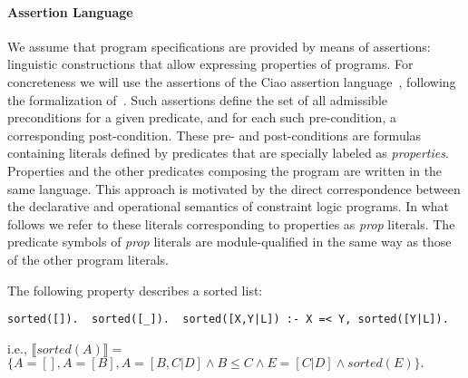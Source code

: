 \documentclass{llncs}
\newcommand{\finalcompression}[1]{\vspace*{#1}}
\begin{document}
\paragraph{Assertion Language}
%
We assume that program specifications are provided by means of
assertions: linguistic constructions that allow expressing properties
of programs.
%
For concreteness we will use the  assertions of the Ciao
assertion language~\cite{%
  prog-glob-an-shorter,%
  assrt-theoret-framework-lopstr99-shorter,hermenegildo11:ciao-design-tplp-shorter},
following the formalization
of~\cite{asrHO-ppdp2014-shorter,optchk-ppdp2016-shorter}.
%
Such  assertions
define the set of all admissible preconditions for
a given predicate, and for each such pre-condition,
a corresponding post-condition.
%
These pre- and post-conditions are formulas containing literals
defined by predicates that are specially labeled as
\emph{properties}.
%
Properties and the other
predicates composing the program are written in the same language.
%
This approach is motivated by the direct correspondence between the
declarative and operational semantics of constraint logic programs.
%
In what follows we refer to these literals corresponding to properties
as \emph{prop} literals.
%
The predicate symbols of \emph{prop} literals are module-qualified in
the same way as those of the other program literals.
\begin{example}[Property]
%
  The following property
  describes a sorted list:
%
\finalcompression{-2mm}
\begin{verbatim}
sorted([]).  sorted([_]).  sorted([X,Y|L]) :- X =< Y, sorted([Y|L]).
\end{verbatim}
\finalcompression{-2mm}
%
  i.e., $\llbracket sorted(A) \rrbracket =$
 {\small $\{A=[], A=[B], A=[B,C|D] \wedge B\leq C \wedge E = [C|D] \wedge sorted(E)\}.$}
\end{example}
\end{document}

